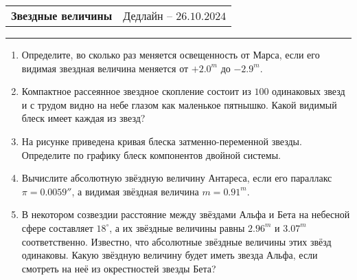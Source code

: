 \documentclass[12pt]{article}
\begin{document}
 \begin{tabularx}{\textwidth}{Xr}
  {\Large \textbf{Звездные величины}} & Дедлайн -- $26.10.2024$ \\
 \end{tabularx}
 \noindent\rule{\textwidth}{0.4pt}
 \begin{enumerate}
        \item Определите, во сколько раз меняется освещенность от Марса, если его видимая звездная величина меняется от $+2.0^m$ до $-2.9^m$.
        \item Компактное рассеянное звездное скопление состоит из $100$ одинаковых звезд и с трудом видно на небе глазом как маленькое пятнышко. Какой видимый блеск имеет каждая из звезд?

        \item На рисунке приведена кривая блеска  затменно-переменной звезды. Определите по графику блеск компонентов двойной системы.

        \begin{figure}[h] 	
            \centering
        \end{figure}
        
        \item Вычислите абсолютную звёздную величину Антареса, если его параллакс $\pi = 0.0059''$, а видимая звёздная величина $m = 0.91^m$.

        \item В некотором созвездии расстояние между звёздами Альфа и Бета на небесной сфере составляет $18^{\circ}$, а их звёздные величины равны $2.96^m$ и $3.07^m$ соответственно. Известно, что абсолютные звёздные величины этих звёзд одинаковы. Какую звёздную величину будет иметь звезда Альфа, если смотреть на неё из окрестностей звезды Бета?
        

\end{enumerate}
\end{document}
